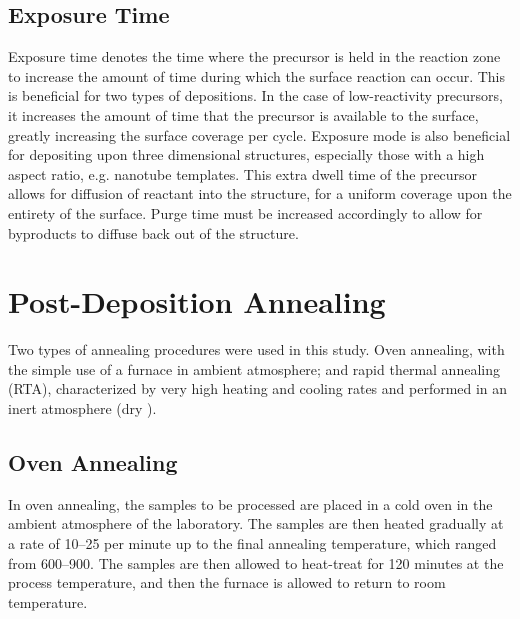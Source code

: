 
\subsection{Exposure Time}

Exposure time denotes the time where the precursor is held in the reaction zone to increase the amount of time during which the surface reaction can occur. This is beneficial for two types of depositions. In the case of low-reactivity precursors, it increases the amount of time that the precursor is available to the surface, greatly increasing the surface coverage per cycle. Exposure mode is also beneficial for depositing upon three dimensional structures, especially those with a high aspect ratio, e.g. nanotube templates. This extra dwell time of the precursor allows for diffusion of reactant into the structure, for a uniform coverage upon the entirety of the surface. Purge time must be increased accordingly to allow for byproducts to diffuse back out of the structure.\cite{ALD-Handbook,gordon_kinetic_2003,Leskela_2002}


\section{Post-Deposition Annealing}
\label{sec:SampFab-Annealing}

Two types of annealing procedures were used in this study. Oven annealing, with the simple use of a furnace in ambient atmosphere; and rapid thermal annealing (RTA), characterized by very high heating and cooling rates and performed in an inert atmosphere (dry ). 



\subsection{Oven Annealing}

In oven annealing, the samples to be processed are placed in a cold oven in the ambient atmosphere of the laboratory. The samples are then heated gradually at a rate of 10--25\degC{} per minute up to the final annealing temperature, which ranged from 600--900\degC{}. The samples are then allowed to heat-treat for 120 minutes at the process temperature, and then the furnace is allowed to return to room temperature. 

